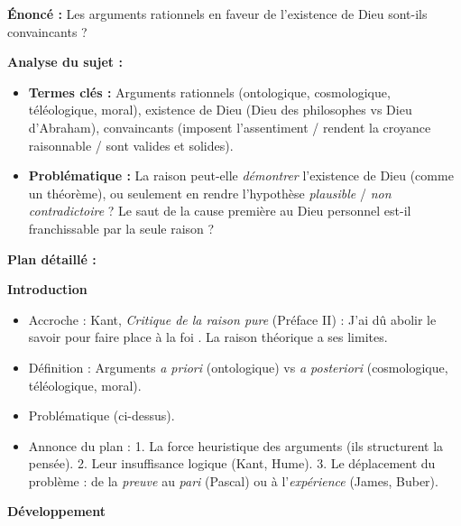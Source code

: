 \documentclass[11pt]{article}
\begin{document}
\begin{exoresolu}
\textbf{Énoncé :} \guillemotleft Les arguments rationnels en faveur de l'existence de Dieu sont-ils convaincants ? \guillemotright

\textbf{Analyse du sujet :}
\begin{itemize}
    \item \textbf{Termes clés :} \guillemotleft Arguments rationnels \guillemotright (ontologique, cosmologique, téléologique, moral), \guillemotleft existence de Dieu \guillemotright (Dieu des philosophes vs Dieu d'Abraham), \guillemotleft convaincants \guillemotright (imposent l'assentiment / rendent la croyance raisonnable / sont valides et solides).
    \item \textbf{Problématique :} La raison peut-elle \emph{démontrer} l'existence de Dieu (comme un théorème), ou seulement en rendre l'hypothèse \emph{plausible} / \emph{non contradictoire} ? Le \guillemotleft saut \guillemotright de la cause première au Dieu personnel est-il franchissable par la seule raison ?
\end{itemize}

\textbf{Plan détaillé :}

\textbf{Introduction}
\begin{itemize}
    \item Accroche : Kant, \emph{Critique de la raison pure} (Préface II) : \guillemotleft J'ai dû abolir le savoir pour faire place à la foi \guillemotright. La raison théorique a ses limites.
    \item Définition : Arguments \emph{a priori} (ontologique) vs \emph{a posteriori} (cosmologique, téléologique, moral).
    \item Problématique (ci-dessus).
    \item Annonce du plan : 1. La force heuristique des arguments (ils structurent la pensée). 2. Leur insuffisance logique (Kant, Hume). 3. Le déplacement du problème : de la \emph{preuve} au \emph{pari} (Pascal) ou à l'\emph{expérience} (James, Buber).
\end{itemize}

\textbf{Développement}


\end{exoresolu}
\end{document}
